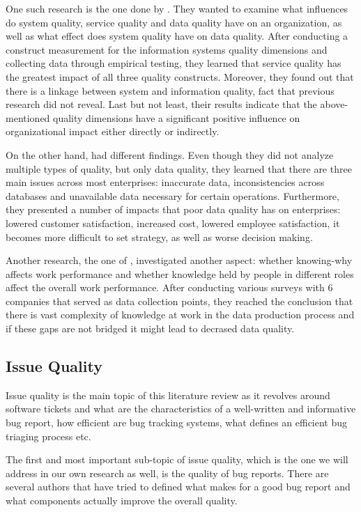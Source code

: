 \documentclass{mprop}
\begin{document}
One such research is the one done by \citet{gorla2010organizational}. They wanted
to examine what influences do system quality, service quality and data quality
have on an organization, as well as what effect does system quality have on
data quality. After conducting a construct measurement for the information
systems quality dimensions \citep{swanson1997maintaining} and collecting data
through empirical testing, they learned that service quality has the greatest
impact of all three quality constructs. Moreover, they found out that there is 
a linkage between system and information quality, fact that previous research
did not reveal. Last but not least, their results indicate that the 
above-mentioned quality dimensions have a significant positive influence on 
organizational impact either directly or indirectly. 

On the other hand, \citet{redman1998impact} had different findings. Even though
they did not analyze multiple types of quality, but only data quality, they 
learned that there are three main issues across most enterprises: inaccurate
data, inconsistencies across databases and unavailable data necessary for 
certain operations. Furthermore, they presented a number of impacts that
poor data quality has on enterprises: lowered customer satisfaction, increased
cost, lowered employee satisfaction, it becomes more difficult to set strategy,
as well as worse decision making.

Another research, the one of \citet{lee2003knowing}, investigated another 
aspect: whether knowing-why affects work performance and whether knowledge held
by people in different roles affect the overall work performance. After
conducting various surveys with 6 companies that served as data collection 
points, they reached the conclusion that there is vast complexity of 
knowledge at work in the data production process and if these gaps are not 
bridged it might lead to decrased data quality.

\subsection{Issue Quality}

Issue quality is the main topic of this literature review as it revolves around
software tickets and what are the characteristics of a well-written and 
informative bug report, how efficient are bug tracking systems, what defines
an efficient bug triaging process etc. 

The first and most important sub-topic of issue quality, which is the one
we will address in our own research as well, is the quality of bug reports.
There are several authors that have tried to defined what makes for a good bug
report and what components actually improve the overall quality.
\end{document}
